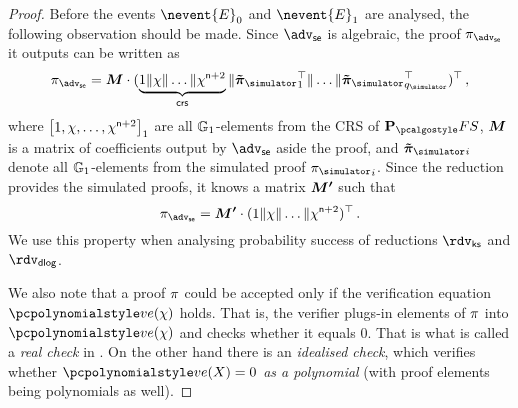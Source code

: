 \documentclass[runningheads,11pt]{llncs}
\let\spvec\vec
\let\vec\accentvec
\let\vec\spvec
\def\vec#1{\mathchoice{\mbox{\boldmath$\displaystyle#1$}}
	{\mbox{\boldmath$\textstyle#1$}}
	{\mbox{\boldmath$\scriptstyle#1$}}
	{\mbox{\boldmath$\scriptscriptstyle#1$}}}
\theoremstyle{definition}
\begin{document}
\begin{proof}
	Before the events $\nevent{E}_0$ and $\nevent{E}_1$ are analysed, the following observation should be made.
	Since $\advse$ is algebraic, the proof $\zkproof_\advse$ it outputs can be written as 
	\[
		\zkproof_\advse = \vec{M} \cdot (\underbrace{1 \| \chi \| \ldots \| \chi^{\numberofconstrains + 2}}_{\crs} \| \vec{\tilde{\zkproof}_\simulator}_1^{\top} \| \ldots \| \vec{\tilde{\zkproof}_\simulator}_{q_\simulator}^\top)^\top\,,
	\]
	where $\left[1, \chi, \ldots, \chi^{\mathsf{n} + 2}\right]_{1}$ are all $\mathbb{G}_1$-elements from the CRS of $\plonkprotfs$, $\vec{M}$ is a matrix of coefficients output by $\advse$ aside the proof, and $\vec{\tilde{\zkproof}_\simulator}_i$ denote all $\mathbb{G}_1$-elements from the simulated proof ${\zkproof_\simulator}_i$. 
	Since the reduction provides the simulated proofs, it knows a matrix $\vec{M'}$ such that
	\begin{equation}
		\label{eq:M_prim}
		\zkproof_\advse = \vec{M'} \cdot (1 \| \chi \| \ldots \| \chi^{\numberofconstrains + 2})^\top\,.
	\end{equation}
	We use this property when analysing probability success of reductions $\rdvks$ and $\rdvdlog$.
	
	We also note that a proof $\pi$ could be accepted only if the verification equation $\vereq(\chi)$ holds. That is, the verifier plugs-in elements of $\pi$ into $\vereq(\chi)$ and checks whether it equals $0$. That is what is called a \emph{real check} in \cite{EPRINT:GabWilCio19}. 
	On the other hand there is an \emph{idealised check}, which verifies whether $\vereq(X) = 0$ \emph{as a polynomial} (with proof elements being polynomials as well).


\end{proof}
\end{document}
